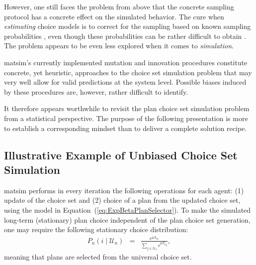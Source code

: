However, one still faces the problem from above that the concrete sampling protocol has a concrete effect on the simulated behavior. The cure when \emph{estimating} choice models is to correct for the sampling based on known sampling probabilities \citep[e.g.][Chapter 9]{ben-akiva-1985}, even though these probabilities can be rather difficult to obtain \citep{floetteroed-2012b, frejinger-2009}. The problem appears to be even less explored when it comes to \emph{simulation}. 

\gls{matsim}'s currently implemented mutation and innovation procedures constitute concrete, yet heuristic, approaches to the choice set simulation problem that may very well allow for valid predictions at the system level.
%
%
%
Possible biases induced by these procedures are, however, rather difficult to identify.
%

It therefore appears worthwhile to revisit the plan choice set simulation
%
%
problem from a statistical perspective. The purpose of the following presentation is more to establish a corresponding mindset than to deliver a complete solution recipe.

\subsection{Illustrative Example of Unbiased Choice Set Simulation} 

\gls{matsim} performs in every iteration the following operations for each
agent: (1) update of the choice set and (2) choice of a plan from
the updated choice set, using the model in Equation~(\ref{eq:ExpBetaPlanSelector}).
To make the simulated long-term (stationary) plan choice independent
of the plan choice set generation, one may require the following stationary
choice distribution:
\begin{eqnarray}
P_{n}(i\mid \mathcal{U}_n) & = & \frac{e^{\mu S_{ni}}}{\sum_{j\in \mathcal{U}_n}e^{\mu S_{nj}}},
\label{eq:global-choice-model}
\end{eqnarray}
meaning that plans are selected from the universal choice set.

